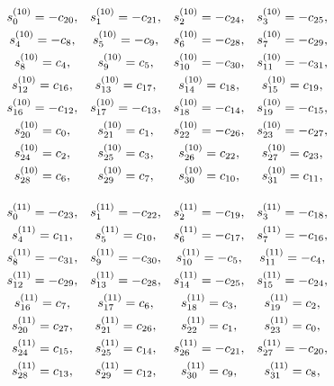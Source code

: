 \documentclass{jtacs}
\numberwithin{equation}{section}
\begin{document}
\begin{center}
\begin{adjustbox}{width=0.57\textwidth, margin=0 0 0 0}
$
\begin{array}{cccc}
\renewcommand*{\arraystretch}{1.5}
\begin{matrix}
s_{0}^{(10)}=-c_{20}, & 	s_{1}^{(10)}=-c_{21}, & 	s_{2}^{(10)}=-c_{24}, & 	s_{3}^{(10)}=-c_{25}, \\
s_{4}^{(10)}=-c_{8}, & 	s_{5}^{(10)}=-c_{9}, & 	s_{6}^{(10)}=-c_{28}, & 	s_{7}^{(10)}=-c_{29}, \\
s_{8}^{(10)}=c_{4}, & 	s_{9}^{(10)}=c_{5}, & 	s_{10}^{(10)}=-c_{30}, & 	s_{11}^{(10)}=-c_{31}, \\	s_{12}^{(10)}=c_{16}, & 	s_{13}^{(10)}=c_{17}, & 	s_{14}^{(10)}=c_{18}, & 	s_{15}^{(10)}=c_{19}, \\
s_{16}^{(10)}=-c_{12}, & 	s_{17}^{(10)}=-c_{13}, & 	s_{18}^{(10)}=-c_{14}, & 	s_{19}^{(10)}=-c_{15}, \\	s_{20}^{(10)}=c_{0}, & 	s_{21}^{(10)}=c_{1}, & 	s_{22}^{(10)}=-c_{26}, & 	s_{23}^{(10)}=-c_{27}, \\
s_{24}^{(10)}=c_{2}, & 	s_{25}^{(10)}=c_{3}, & 	s_{26}^{(10)}=c_{22}, & 	s_{27}^{(10)}=c_{23}, \\	s_{28}^{(10)}=c_{6}, & 	s_{29}^{(10)}=c_{7}, & 	s_{30}^{(10)}=c_{10}, & 	s_{31}^{(10)}=c_{11}, \\
\end{matrix}
\end{array}
$
\end{adjustbox}
\end{center}

\begin{center}
\begin{adjustbox}{width=0.57\textwidth, margin=0 0 0 0}
$
\begin{array}{cccc}
\renewcommand*{\arraystretch}{1.5}
\begin{matrix}
s_{0}^{(11)}=-c_{23}, & 	s_{1}^{(11)}=-c_{22}, & 	s_{2}^{(11)}=-c_{19}, & 	s_{3}^{(11)}=-c_{18}, \\	s_{4}^{(11)}=c_{11}, & 	s_{5}^{(11)}=c_{10}, & 	s_{6}^{(11)}=-c_{17}, & 	s_{7}^{(11)}=-c_{16}, \\
s_{8}^{(11)}=-c_{31}, & 	s_{9}^{(11)}=-c_{30}, & 	s_{10}^{(11)}=-c_{5}, & 	s_{11}^{(11)}=-c_{4}, \\
s_{12}^{(11)}=-c_{29}, & 	s_{13}^{(11)}=-c_{28}, & 	s_{14}^{(11)}=-c_{25}, & 	s_{15}^{(11)}=-c_{24}, \\
s_{16}^{(11)}=c_{7}, & 	s_{17}^{(11)}=c_{6}, & 	s_{18}^{(11)}=c_{3}, & 	s_{19}^{(11)}=c_{2}, \\	s_{20}^{(11)}=c_{27}, & 	s_{21}^{(11)}=c_{26}, & 	s_{22}^{(11)}=c_{1}, & 	s_{23}^{(11)}=c_{0}, \\
s_{24}^{(11)}=c_{15}, & 	s_{25}^{(11)}=c_{14}, & 	s_{26}^{(11)}=-c_{21}, & 	s_{27}^{(11)}=-c_{20}, \\	s_{28}^{(11)}=c_{13}, & 	s_{29}^{(11)}=c_{12}, & 	s_{30}^{(11)}=c_{9}, & 	s_{31}^{(11)}=c_{8}, \\

\end{matrix}
\end{array}
$
\end{adjustbox}
\end{center}
\end{document}
